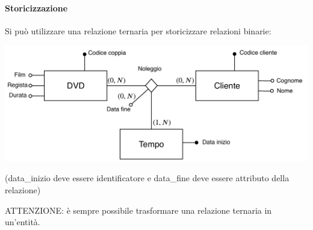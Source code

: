 \documentclass[a4paper, 10pt]{report}
\begin{document}
\paragraph*{Storicizzazione} Si può utilizzare una relazione ternaria per storicizzare relazioni binarie:

\begin{center}
\includegraphics[scale=0.5]{22ottobre02.pdf}

(data\_inizio deve essere identificatore e data\_fine deve essere attributo della relazione)
\end{center}



\noindent ATTENZIONE: è sempre possibile trasformare una relazione ternaria in un'entità.
\end{document}
